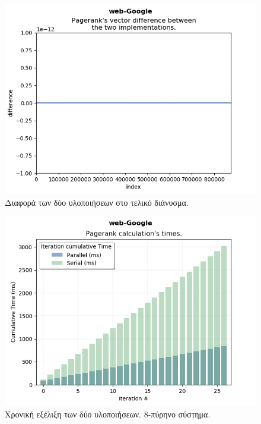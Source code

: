 \begin{center}
\begin{figure}
\includegraphics[width=\linewidth]{plots/diff.png}
\caption{Διαφορά των δύο υλοποιήσεων στο τελικό διάνυσμα.}
\end{figure}

\begin{figure}
\includegraphics[width=\linewidth]{plots/it_times_diades.png}
\caption{Χρονική εξέλιξη των δύο υλοποιήσεων. 8-πύρηνο σύστημα.}
\end{figure}


\end{center}
